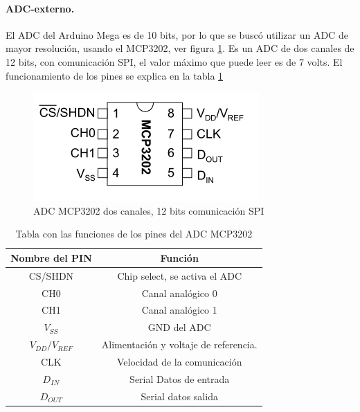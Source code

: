 \paragraph{ADC-externo.}
El ADC del Arduino Mega es de 10 bits, por lo que se buscó utilizar un ADC de mayor resolución, usando el MCP3202, ver figura \ref{fig:mcp3202}. Es un ADC de dos canales de 12 bits, con comunicación SPI, el valor máximo que puede leer es de 7 volts. El funcionamiento de los pines se explica en la tabla \ref{tabla:ADC}

\begin{figure}[h!]
	\centering
	\includegraphics[width=0.4\linewidth]{Imagenes/2/MCP3202}
	\caption{ADC MCP3202 dos canales, 12 bits comunicación SPI \cite{MCP3202}}
	\label{fig:mcp3202}
\end{figure}

\begin{table}[h]
	\centering
	\caption{Tabla con las funciones de los pines del ADC MCP3202 \cite{MCP3202}}
\begin{tabular}{|c|c|}
	\hline 
	Nombre del PIN & Función  \\ 
	\hline 
	CS/SHDN & Chip select, se activa el ADC \\ 
	\hline 
	CH0 & Canal analógico 0 \\ 
	\hline 
	CH1 & Canal analógico 1 \\ 
	\hline 
	$V_{SS}$ & GND del ADC \\
	\hline
	$V_{DD}/V_{REF}$ & Alimentación y voltaje de referencia. \\  
	\hline
	CLK & Velocidad de la comunicación  \\ 
	\hline 
	$D_{IN}$ & Serial Datos de entrada \\ 
	\hline 
	$D_{OUT}$ & Serial datos salida \\ 
	\hline 

\end{tabular} 
	\label{tabla:ADC}
\end{table}

